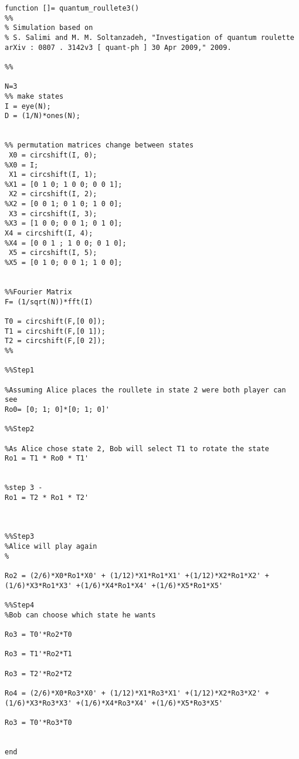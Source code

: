 \label{ap:c}


\begin{lstlisting}
function []= quantum_roullete3()
%%
% Simulation based on
% S. Salimi and M. M. Soltanzadeh, "Investigation of quantum roulette arXiv : 0807 . 3142v3 [ quant-ph ] 30 Apr 2009," 2009.

%%

N=3
%% make states
I = eye(N);
D = (1/N)*ones(N);


%% permutation matrices change between states
 X0 = circshift(I, 0);
%X0 = I;
 X1 = circshift(I, 1);
%X1 = [0 1 0; 1 0 0; 0 0 1];
 X2 = circshift(I, 2);
%X2 = [0 0 1; 0 1 0; 1 0 0];
 X3 = circshift(I, 3);
%X3 = [1 0 0; 0 0 1; 0 1 0];
X4 = circshift(I, 4);
%X4 = [0 0 1 ; 1 0 0; 0 1 0];
 X5 = circshift(I, 5);
%X5 = [0 1 0; 0 0 1; 1 0 0];


%%Fourier Matrix
F= (1/sqrt(N))*fft(I)

T0 = circshift(F,[0 0]);
T1 = circshift(F,[0 1]);
T2 = circshift(F,[0 2]);
%%

%%Step1

%Assuming Alice places the roullete in state 2 were both player can see
Ro0= [0; 1; 0]*[0; 1; 0]'

%%Step2

%As Alice chose state 2, Bob will select T1 to rotate the state
Ro1 = T1 * Ro0 * T1'


%step 3 -
Ro1 = T2 * Ro1 * T2'



%%Step3
%Alice will play again 
%

Ro2 = (2/6)*X0*Ro1*X0' + (1/12)*X1*Ro1*X1' +(1/12)*X2*Ro1*X2' +(1/6)*X3*Ro1*X3' +(1/6)*X4*Ro1*X4' +(1/6)*X5*Ro1*X5'

%%Step4
%Bob can choose which state he wants

Ro3 = T0'*Ro2*T0

Ro3 = T1'*Ro2*T1

Ro3 = T2'*Ro2*T2

Ro4 = (2/6)*X0*Ro3*X0' + (1/12)*X1*Ro3*X1' +(1/12)*X2*Ro3*X2' +(1/6)*X3*Ro3*X3' +(1/6)*X4*Ro3*X4' +(1/6)*X5*Ro3*X5'

Ro3 = T0'*Ro3*T0


end

\end{lstlisting}